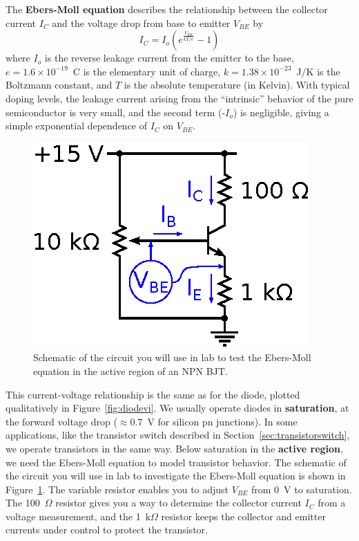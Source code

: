 \documentclass[11pt]{article}
\begin{document}
The \textbf{Ebers-Moll equation} describes the relationship between
the collector current $I_C$ and the voltage drop from base to emitter
$V_{BE}$ by 
\begin{equation}
  I_C = I_o \left( e^{\frac{V_{BE}}{kT/e}} - 1 \right)
  \label{eq:ebersmoll}
\end{equation}
where $I_o$ is the reverse leakage current from the emitter to the
base, $e = 1.6 \times 10^{-19}$~C is the elementary unit of charge,
$k = 1.38 \times 10^{-23}$~J/K is the Boltzmann constant, and $T$ is the
absolute temperature (in Kelvin). With typical doping levels, the
leakage current arising from the ``intrinsic'' behavior of the pure
semiconductor is very small, and the second term (-$I_o$) is
negligible, giving a simple exponential dependence of $I_C$ on
$V_{BE}$.

\begin{figure}[ht]
  \begin{center}
    \includegraphics{ebersmollcircuit.eps}
    \caption{Schematic of the circuit you will use in lab to
      test the Ebers-Moll equation in the active region of an NPN
      BJT.}
    \label{fig:ebersmollcircuit}
  \end{center}
\end{figure}

This current-voltage relationship is the same as for the diode,
plotted qualitatively in Figure~\ref{fig:diodevi}. We usually operate
diodes in \textbf{saturation}, at the forward voltage drop ($\approx
0.7$~V for silicon pn junctions). In some applications, like the
transistor switch described in Section~\ref{sec:transistorswitch}, we
operate transistors in the same way. Below saturation in the
\textbf{active region}, we need the Ebers-Moll equation to model
transistor behavior. The schematic of the circuit you will use in lab
to investigate the Ebers-Moll equation is shown in
Figure~\ref{fig:ebersmollcircuit}. The variable resistor enables you
to adjust $V_{BE}$ from 0~V to saturation. The 100~$\Omega$ resistor
gives you a way to determine the collector current $I_C$ from a
voltage measurement, and the 1~k$\Omega$ resistor keeps the collector
and emitter currents under control to protect the transistor.
\end{document}
